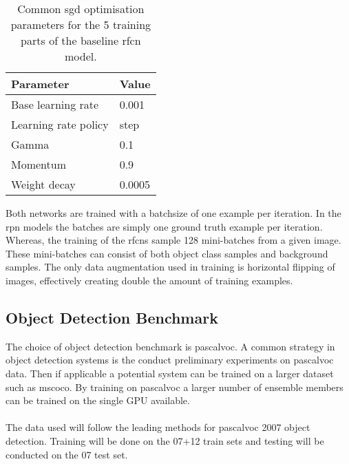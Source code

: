 \documentclass[a4paper,twoside]{article}
\begin{document}
\begin{table}[h]
\centering
\caption{Common \gls{sgd} optimisation parameters for the 5 training parts of the baseline \gls{rfcn} model.}
\label{tab:trainparams}
\begin{tabular}{|l|l|}
\hline
\textbf{Parameter}            & \textbf{Value}  \\ \hline
Base learning rate   & 0.001  \\ \hline
Learning rate policy & step   \\ \hline
Gamma                & 0.1    \\ \hline
Momentum             & 0.9    \\ \hline
Weight decay         & 0.0005 \\ \hline
\end{tabular}
\end{table}

 Both networks are trained with a batchsize of one example per iteration. In the \gls{rpn} models the batches are simply one ground truth example per iteration. Whereas, the training of the \glspl{rfcn} sample 128 mini-batches from a given image. These mini-batches can consist of both object class samples and background samples. 
 The only data augmentation used in training is horizontal flipping of images, effectively creating double the amount of training examples.

 \subsection{Object Detection Benchmark}
 The choice of object detection benchmark is \gls{pascalvoc}. A common strategy in object detection systems is the conduct preliminary experiments on \gls{pascalvoc} data. Then if applicable a potential system can be trained on a larger dataset such as \gls{mscoco}. By training on \gls{pascalvoc} a larger number of ensemble members can be trained on the single GPU available.
 \\\\
 The data used will follow the leading methods for \gls{pascalvoc} 2007 object detection. Training will be done on the 07+12 train sets and testing will be conducted on the 07 test set.
\end{document}
